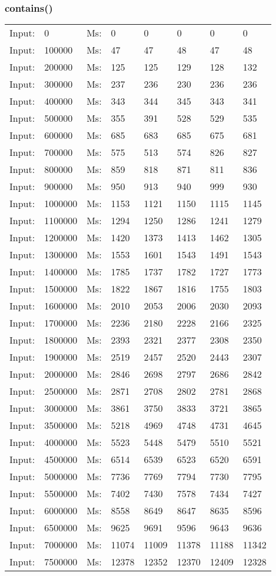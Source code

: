 \documentclass[11pt,a4paper]{report}
\begin{document}
\begin{tiny}
\subsubsection*{contains()}
\begin{tabular}{l l ||l  l  l  l  l  l}
Input:&0&Ms:&0&0&0&0&0\\
Input:&100000&Ms:&47&47&48&47&48\\
Input:&200000&Ms:&125&125&129&128&132\\
Input:&300000&Ms:&237&236&230&236&236\\
Input:&400000&Ms:&343&344&345&343&341\\
Input:&500000&Ms:&355&391&528&529&535\\
Input:&600000&Ms:&685&683&685&675&681\\
Input:&700000&Ms:&575&513&574&826&827\\
Input:&800000&Ms:&859&818&871&811&836\\
Input:&900000&Ms:&950&913&940&999&930\\
Input:&1000000&Ms:&1153&1121&1150&1115&1145\\
Input:&1100000&Ms:&1294&1250&1286&1241&1279\\
Input:&1200000&Ms:&1420&1373&1413&1462&1305\\
Input:&1300000&Ms:&1553&1601&1543&1491&1543\\
Input:&1400000&Ms:&1785&1737&1782&1727&1773\\
Input:&1500000&Ms:&1822&1867&1816&1755&1803\\
Input:&1600000&Ms:&2010&2053&2006&2030&2093\\
Input:&1700000&Ms:&2236&2180&2228&2166&2325\\
Input:&1800000&Ms:&2393&2321&2377&2308&2350\\
Input:&1900000&Ms:&2519&2457&2520&2443&2307\\
Input:&2000000&Ms:&2846&2698&2797&2686&2842\\
Input:&2500000&Ms:&2871&2708&2802&2781&2868\\
Input:&3000000&Ms:&3861&3750&3833&3721&3865\\
Input:&3500000&Ms:&5218&4969&4748&4731&4645\\
Input:&4000000&Ms:&5523&5448&5479&5510&5521\\
Input:&4500000&Ms:&6514&6539&6523&6520&6591\\
Input:&5000000&Ms:&7736&7769&7794&7730&7795\\
Input:&5500000&Ms:&7402&7430&7578&7434&7427\\
Input:&6000000&Ms:&8558&8649&8647&8635&8596\\
Input:&6500000&Ms:&9625&9691&9596&9643&9636\\
Input:&7000000&Ms:&11074&11009&11378&11188&11342\\
Input:&7500000&Ms:&12378&12352&12370&12409&12328\\
\end{tabular}
\\

\end{tiny}
\end{document}

